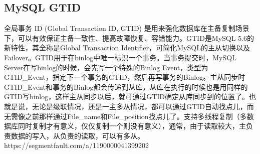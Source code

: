 \documentclass[../../../interview-questions.tex]{subfiles}
\begin{document}
\subsection{MySQL GTID}

全局事务 ID (Global Transaction ID, GTID) 是用来强化数据库在主备复制场景下，可以有效保证主备一致性、提高故障恢复、容错能力。GTID是MySQL 5.6的新特性，其全称是Global Transaction Identifier，可简化MySQL的主从切换以及Failover。GTID用于在binlog中唯一标识一个事务。当事务提交时，MySQL Server在写binlog的时候，会先写一个特殊的Binlog Event，类型为GTID\_Event，指定下一个事务的GTID，然后再写事务的Binlog。主从同步时GTID\_Event和事务的Binlog都会传递到从库，从库在执行的时候也是用同样的GTID写binlog，这样主从同步以后，就可通过GTID确定从库同步到的位置了。也就是说，无论是级联情况，还是一主多从情况，都可以通过GTID自动找点儿，而无需像之前那样通过File\_name和File\_position找点儿了。支持多线程复制（多数据库同时复制才有意义，仅仅复制一个则没有意义），通常，由于读取较大，主负责数据的写入，从负责的读取，可以有多从。
https://segmentfault.com/a/1190000041399202
\end{document}

